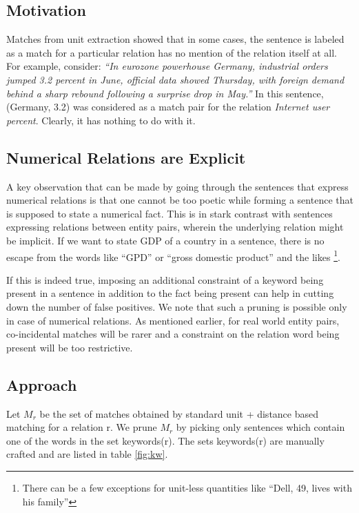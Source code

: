 \documentclass[a4paper,10pt]{article}
\begin{document}
\subsection{Motivation}
Matches from unit extraction showed that in some cases, the sentence is labeled as a
match for a particular relation has no mention of the relation itself at all.
For example, consider:
\emph{“In eurozone powerhouse Germany, industrial orders jumped 3.2 percent in June, official data
showed Thursday, with foreign demand behind a sharp rebound following a surprise drop in May.”}
In this sentence, (Germany, 3.2) was considered as a match pair for the relation \emph{Internet user
percent}. Clearly, it has nothing to do with it.

\subsection{Numerical Relations are Explicit}
A key observation that can be made by going through the sentences that express numerical relations
is that one cannot be too poetic while forming a sentence that is supposed to state a numerical fact.
This is in stark contrast with sentences expressing relations between entity pairs, wherein the
underlying relation might be implicit. If we want to state GDP of a country in a sentence, there is no
escape from the words like “GPD” or “gross domestic product” and the likes \footnote{There can be a few exceptions for unit-less quantities like ``Dell, 49, lives with his family''}.

If this is indeed true, imposing an additional constraint of a keyword being present in a sentence in
addition to the fact being present can help in cutting down the number of false positives. We note
that such a pruning is possible only in case of numerical relations. As mentioned earlier, for real
world entity pairs, co-incidental matches will be rarer and a constraint on the relation word being
present will be too restrictive.

\subsection{Approach}
Let $M_r$ be the set of matches obtained by standard unit + distance based matching for a relation r.
We prune $M_r$ by picking only sentences which contain one of the words in the set keywords(r).
The sets keywords(r) are manually crafted and are listed in table \ref{fig:kw}.
\end{document}

